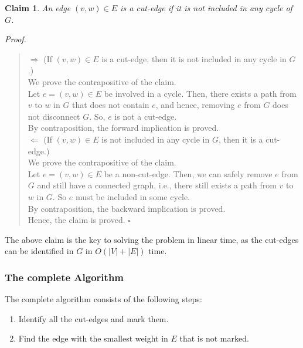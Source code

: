 \documentclass[12pt]{report}
\newtheorem{claim}{Claim}
\begin{document}
    \begin{claim}
        An edge $(v, w) \in E$ is a cut-edge if it is not included in any cycle of $G$.
    \end{claim}
    \textit{Proof.}
    \begin{quote}
        $\Rightarrow$ (If $(v, w) \in E$ is a cut-edge, then it is not included in any cycle in $G$.) \\
        We prove the contrapositive of the claim. \\
        Let $e = (v, w) \in E$ be involved in a cycle. Then, there exists a path from $v$ to $w$ in $G$
        that does not contain $e$, and hence, removing $e$ from $G$ does not disconnect $G$.
        So, $e$ is not a cut-edge. \\
        By contraposition, the forward implication is proved.
        \vspace*{7.5pt} \\
        $\Leftarrow$ (If $(v, w) \in E$ is not included in any cycle in $G$, then it is a cut-edge.) \\
        We prove the contrapositive of the claim. \\
        Let $e = (v, w) \in E$ be a non-cut-edge. Then, we can safely remove $e$ from $G$ and still have a connected graph,
        i.e., there still exists a path from $v$ to $w$ in $G$.
        So $e$ must be included in some cycle. \\
        By contraposition, the backward implication is proved.
        \vspace*{7.5pt} \\
        Hence, the claim is proved. \hfill $\square$
    \end{quote}
    The above claim is the key to solving the problem in linear time, as the cut-edges can be identified in $G$ in $O(|V|+|E|)$ time.

    \subsubsection*{The complete Algorithm}
    The complete algorithm consists of the following steps:
    \begin{enumerate}
        \item Identify all the cut-edges and mark them.
        \item Find the edge with the smallest weight in $E$ that is not marked.
    \end{enumerate}
\end{document}
